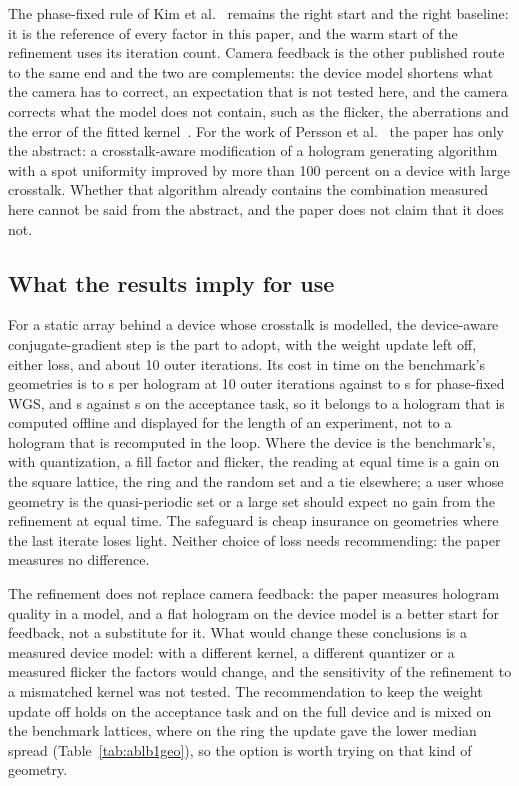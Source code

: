 The phase-fixed rule of Kim et al.~\cite{kim2019} remains the right start and the right baseline: it is the reference of every factor in this paper, and the warm start of the refinement uses its iteration count. Camera feedback is the other published route to the same end and the two are complements: the device model shortens what the camera has to correct, an expectation that is not tested here, and the camera corrects what the model does not contain, such as the flicker, the aberrations and the error of the fitted kernel~\cite{nogrette,schroff}. For the work of Persson et al.~\cite{persson} the paper has only the abstract: a crosstalk-aware modification of a hologram generating algorithm with a spot uniformity improved by more than 100 percent on a device with large crosstalk. Whether that algorithm already contains the combination measured here cannot be said from the abstract, and the paper does not claim that it does not.

\subsection{What the results imply for use}

For a static array behind a device whose crosstalk is modelled, the device-aware conjugate-gradient step is the part to adopt, with the weight update left off, either loss, and about 10 outer iterations. Its cost in time on the benchmark's geometries is \benchTenSecRefMin{} to \benchTenSecRefMax{} s per hologram at 10 outer iterations against \benchTenSecMsevenMin{} to \benchTenSecMsevenMax{} s for phase-fixed WGS, and \secBXMedian{} s against \secMXSevenHundred{} s on the acceptance task, so it belongs to a hologram that is computed offline and displayed for the length of an experiment, not to a hologram that is recomputed in the loop. Where the device is the benchmark's, with quantization, a fill factor and flicker, the reading at equal time is a gain on the square lattice, the ring and the random set and a tie elsewhere; a user whose geometry is the quasi-periodic set or a large set should expect no gain from the refinement at equal time. The safeguard is cheap insurance on geometries where the last iterate loses light. Neither choice of loss needs recommending: the paper measures no difference.

The refinement does not replace camera feedback: the paper measures hologram quality in a model, and a flat hologram on the device model is a better start for feedback, not a substitute for it. What would change these conclusions is a measured device model: with a different kernel, a different quantizer or a measured flicker the factors would change, and the sensitivity of the refinement to a mismatched kernel was not tested. The recommendation to keep the weight update off holds on the acceptance task and on the full device and is mixed on the benchmark lattices, where on the ring the update gave the lower median spread (Table~\ref{tab:ablb1geo}), so the option is worth trying on that kind of geometry.
